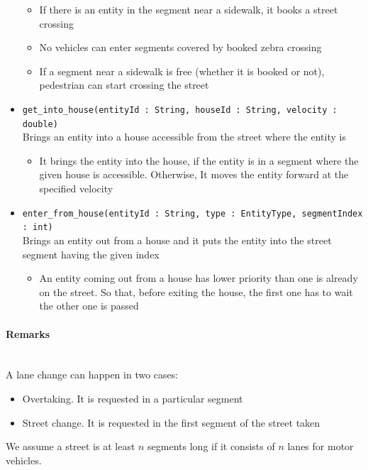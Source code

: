 \begin{itemize}
\begin{itemize}
		\item If there is an entity in the segment near a sidewalk, it books a street crossing
		\item No vehicles can enter segments covered by booked zebra crossing
		\item If a segment near a sidewalk is free (whether it is booked or not), pedestrian can start crossing the street
	\end{itemize}
	\item \texttt{get\_into\_house(entityId : String, houseId : String, velocity : double)}
	\\Brings an entity into a house accessible from the street where the entity is
	\begin{itemize}
		\item It brings the entity into the house, if the entity is in a segment where the given house is accessible. Otherwise, It moves the entity forward at the specified velocity
	\end{itemize}
	\item \texttt{enter\_from\_house(entityId : String, type : EntityType, segmentIndex : int)}
	\\Brings an entity out from a house and it puts the entity into the street segment having the given index
	\begin{itemize}
		\item An entity coming out from a house has lower priority than one is already on the street. So that, before exiting the house, the first one has to wait the other one is passed
	\end{itemize}
\end{itemize}
\paragraph{Remarks}
\ \\A lane change can happen in two cases:
\begin{itemize}
	\item Overtaking. It is requested in a particular segment
	\item Street change. It is requested in the first segment of the street taken
\end{itemize}
We assume a street is at least $n$ segments long if it consists of $n$ lanes for motor vehicles.